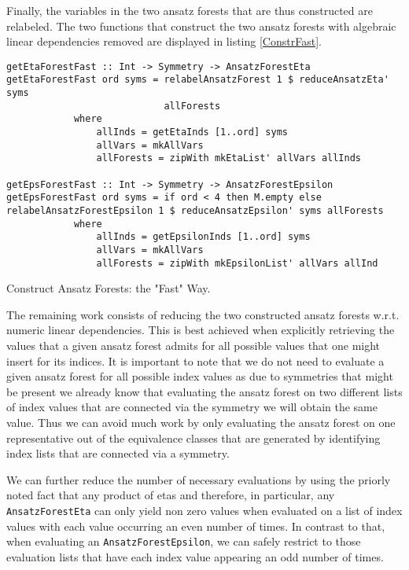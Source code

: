 Finally, the variables in the two ansatz forests that are thus constructed are relabeled. The two functions that construct the two ansatz forests with algebraic linear dependencies removed are displayed in listing \ref{ConstrFast}.
\begin{listing}[hbt!]
\begin{verbatim}
getEtaForestFast :: Int -> Symmetry -> AnsatzForestEta
getEtaForestFast ord syms = relabelAnsatzForest 1 $ reduceAnsatzEta' syms 
                            allForests
            where
                allInds = getEtaInds [1..ord] syms
                allVars = mkAllVars
                allForests = zipWith mkEtaList' allVars allInds

getEpsForestFast :: Int -> Symmetry -> AnsatzForestEpsilon
getEpsForestFast ord syms = if ord < 4 then M.empty else
relabelAnsatzForestEpsilon 1 $ reduceAnsatzEpsilon' syms allForests
            where
                allInds = getEpsilonInds [1..ord] syms
                allVars = mkAllVars
                allForests = zipWith mkEpsilonList' allVars allInd
\end{verbatim} 
\caption{Construct Ansatz Forests: the "Fast" Way.}\label{ConstrFast}
\end{listing}

The remaining work consists of reducing the two constructed ansatz forests w.r.t. numeric linear dependencies. This is best achieved when explicitly retrieving the values that a given ansatz forest admits for all possible values that one might insert for its indices. It is important to note that we do not need to evaluate a given ansatz forest for all possible index values as due to symmetries that might be present we already know that evaluating the ansatz forest on two different lists of index values that are connected via the symmetry we will obtain the same value. Thus we can avoid much work by only evaluating the ansatz forest on one representative out of the equivalence classes that are generated by identifying index lists that are connected via a symmetry. 

We can further reduce the number of necessary evaluations by using the priorly noted fact that any product of etas and therefore, in particular, any \texttt{AnsatzForestEta} can only yield non zero values when evaluated on a list of index values with each value occurring an even number of times. In contrast to that, when evaluating an \texttt{AnsatzForestEpsilon}, we can safely restrict to those evaluation lists that have each index value appearing an odd number of times.

